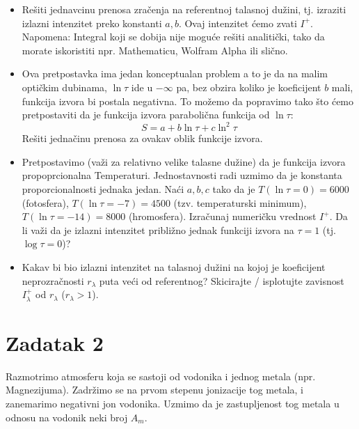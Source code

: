 \documentclass[12pt]{article}
\begin{document}
\begin{itemize}
    \item Re\v{s}iti jedna{v}cinu prenosa zra\v{c}enja na referentnoj talasnoj du\v{z}ini, tj. izraziti izlazni intenzitet preko konstanti $a, b$. Ovaj intenzitet \'{c}emo zvati $I^+$. Napomena: Integral koji se dobija nije mogu\'{c}e re\v{s}iti analiti\v{c}ki, tako da morate iskoristiti npr. Mathematicu, Wolfram Alpha ili sli\v{c}no.
    
    \item Ova pretpostavka ima jedan konceptualan problem a to je da na malim opti\v{c}kim dubinama, $\ln \tau$ ide u $-\infty$ pa, bez obzira koliko je koeficijent $b$ mali, funkcija izvora bi postala negativna. To mo\v{z}emo da popravimo tako \v{s}to \'{c}emo pretpostaviti da je funkcija izvora paraboli\v{c}na funkcija od $\ln \tau$:
    \begin{equation}
        S = a + b\ln \tau + c \ln^2 \tau
    \end{equation}
    Re\v{s}iti jedna\v{c}inu prenosa za ovakav oblik funkcije izvora. 
    
    \item Pretpostavimo (va\v{z}i za relativno velike talasne du\v{z}ine) da je funkcija izvora propoprcionalna Temperaturi. Jednostavnosti radi uzmimo da je konstanta proporcionalnosti jednaka jedan. Na\'{c}i $a, b, c$ tako da je $T(\ln\tau=0) = 6000$ (fotosfera), $T(\ln\tau=-7) = 4500$ (tzv. temperaturski minimum), $T(\ln\tau=-14) = 8000$ (hromosfera). Izra\v{c}unaj numeri\v{c}ku vrednost $I^+$. Da li va\v{z}i da je izlazni intenzitet pribli\v{z}no jednak funkciji izvora na $\tau=1$ (tj. $\log \tau = 0$)?

    \item Kakav bi bio izlazni intenzitet na talasnoj du\v{z}ini na kojoj je koeficijent neprozra\v{c}nosti $r_\lambda$ puta ve\'{c}i od referentnog? Skicirajte / isplotujte zavisnost $I^+_\lambda$ od $r_\lambda$ ($r_\lambda >  1$).
    
\end{itemize}

\section*{Zadatak 2}

Razmotrimo atmosferu koja se sastoji od vodonika i jednog metala (npr. Magnezijuma). Zadr\v{z}imo se na prvom stepenu jonizacije tog metala, i zanemarimo negativni jon vodonika. Uzmimo da je zastupljenost tog metala u odnosu na vodonik neki broj $A_m$. 
\end{document}
